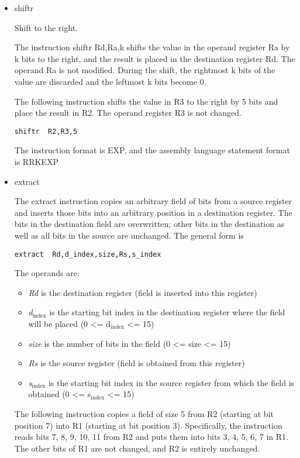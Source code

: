 \documentclass[11pt]{article}
\begin{document}
\begin{itemize}
\item shiftr
\label{sec:org14f83ff}

Shift to the right.

The instruction shiftr Rd,Ra,k shifts the value in the operand
register Ra by k bits to the right, and the result is placed in the
destination register Rd.  The operand Ra is not modified.  During the
shift, the rightmost k bits of the value are discarded and the
leftmost k bits become 0.

The following instruction shifts the value in R3 to the right by 5
bits and place the result in R2.  The operand register R3 is not
changed.

\begin{verbatim}
shiftr  R2,R3,5
\end{verbatim}

The instruction format is EXP, and the assembly language statement format
is RRKEXP

\item extract
\label{sec:org5715c5b}

The extract instruction copies an arbitrary field of bits from a
source register and inserts those bits into an arbitrary position in a
destination register.  The bits in the destination field are
overwritten; other bits in the destination as well as all bits in the
source are unchanged.  The general form is

\begin{verbatim}
extract  Rd,d_index,size,Rs,s_index
\end{verbatim}

The operands are:
\begin{itemize}
\item \emph{Rd} is the destination register (field is inserted into this
register)
\item \emph{d\(_{\text{index}}\)} is the starting bit index in the destination register
where the field will be placed (0 <= d\(_{\text{index}}\) <= 15)
\item \emph{size} is the number of bits in the field (0 <= size <= 15)
\item \emph{Rs} is the source register (field is obtained from this register)
\item \emph{s\(_{\text{index}}\)} is the starting bit index in the source register from
which the field is obtained (0 <= s\(_{\text{index}}\) <= 15)
\end{itemize}

The following instruction copies a field of size 5 from R2 (starting
at bit position 7) into R1 (starting at bit position 3).
Specifically, the instruction reads bits 7, 8, 9, 10, 11 from R2 and
puts them into bits 3, 4, 5, 6, 7 in R1.  The other bits of R1 are not
changed, and R2 is entirely unchanged.


\end{itemize}
\end{document}
